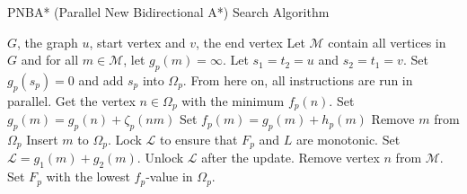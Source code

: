 \begin{algorithm}[H]
    \caption{PNBA* (Parallel New Bidirectional A*) Search Algorithm}
    \begin{algorithmic}
        \REQUIRE $G$, the graph 
        \REQUIRE $u$, start vertex and $v$, the end vertex
        \STATE Let $\mathcal{M}$ contain all vertices in $G$ and for all $m\in\mathcal{M}$, let $g_p(m)=\infty$.
        \STATE Let $s_1=t_2=u$ and $s_2=t_1=v$.
        \STATE Set $g_p(s_p) = 0$ and add $s_p$ into $\Omega_p$.
        \STATE From here on, all instructions are run in parallel.
            \STATE Get the vertex $n\in\Omega_p$ with the minimum $f_p(n)$.
                            \STATE Set $g_p(m)=g_p(n)+\zeta_p(nm)$
                            \STATE Set $f_p(m)=g_p(m)+h_p(m)$
                                \STATE Remove $m$ from $\Omega_p$ 
                            \ENDIF
                            \STATE Insert $m$ to $\Omega_p$.
                                \STATE Lock $\mathcal{L}$ to ensure that $F_p$ and $L$ are monotonic.
                                    \STATE Set $\mathcal{L}=g_1(m)+g_2(m)$.
                                \ENDIF
                                \STATE Unlock $\mathcal{L}$ after the update.
                            \ENDIF
                        \ENDIF
                    \ENDFOR
                \ENDIF
                \STATE Remove vertex $n$ from $\mathcal{M}$.
            \ENDIF
                \STATE Set $F_p$ with the lowest $f_p$-value in $\Omega_p$.
            \ENDIF
        \ENDWHILE
    \end{algorithmic}
\end{algorithm}

